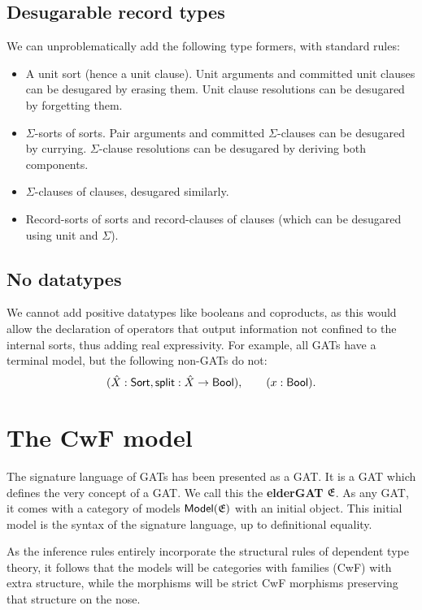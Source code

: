 \documentclass[a4paper]{article}
\begin{document}
\subsection{Desugarable record types}
We can unproblematically add the following type formers, with standard rules:
\begin{itemize}[noitemsep]
	\item A unit sort (hence a unit clause). Unit arguments and committed unit clauses can be desugared by erasing them. Unit clause resolutions can be desugared by forgetting them.
	\item $\Sigma$-sorts of sorts. Pair arguments and committed $\Sigma$-clauses can be desugared by currying. $\Sigma$-clause resolutions can be desugared by deriving both components.
	\item $\Sigma$-clauses of clauses, desugared similarly.
	\item Record-sorts of sorts and record-clauses of clauses (which can be desugared using unit and $\Sigma$).
\end{itemize}

\subsection{No datatypes}
We cannot add positive datatypes like booleans and coproducts, as this would allow the declaration of operators that output information not confined to the internal sorts, thus adding real expressivity. For example, all GATs have a terminal model, but the following non-GATs do not:
\[
	(\hat X : {\mathsf{Sort}}, \mathsf{split} : \hat X \to {\mathsf{Bool}}), \qquad
	(x : {\mathsf{Bool}}).
\]

\section{The CwF model}
The signature language of GATs has been presented as a GAT.
It is a GAT which defines the very concept of a GAT.
We call this the \textbf{elderGAT} ${{\mathfrak{E}}}$.
As any GAT, it comes with a category of models ${\mathsf{Model}}({{\mathfrak{E}}})$ with an initial object.
This initial model is the syntax of the signature language, up to definitional equality.

As the inference rules entirely incorporate the structural rules of dependent type theory, it follows that the models will be categories with families (CwF) \cite{dybjer-cwf} with extra structure, while the morphisms will be strict CwF morphisms preserving that structure on the nose.
\end{document}
